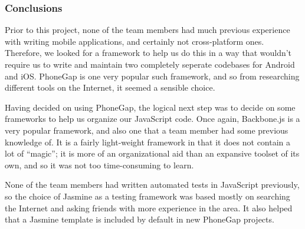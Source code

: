 \subsubsection{Conclusions}
Prior to this project, none of the team members had much previous experience
with writing mobile applications, and certainly not cross-platform ones.
Therefore, we looked for a framework to help us do this in a way that wouldn't
require us to write and maintain two completely seperate codebases for Android
and iOS. PhoneGap is one very popular such framework, and so from researching
different tools on the Internet, it seemed a sensible choice.

Having decided on using PhoneGap, the logical next step was to decide on some
frameworks to help us organize our JavaScript code. Once again, Backbone.js is
a very popular framework, and also one that a team member had some previous
knowledge of. It is a fairly light-weight framework in that it does not contain
a lot of ``magic''; it is more of an organizational aid than an expansive
toolset of its own, and so it was not too time-consuming to learn.

None of the team members had written automated tests in JavaScript previously,
so the choice of Jasmine as a testing framework was based mostly on searching
the Internet and asking friends with more experience in the area. It also
helped that a Jasmine template is included by default in new PhoneGap projects.

